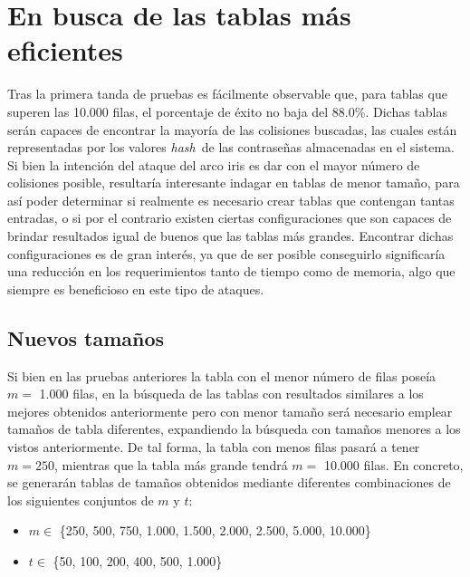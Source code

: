 \documentclass[12pt,spanish,listoffigures,listoftables,listofalgorithms]{tfgetsinf}
\newcommand{\hash}{\textit{hash}}
\begin{document}
\section{En busca de las tablas más eficientes} \label{config perf}

Tras la primera tanda de pruebas es fácilmente observable que, para tablas que superen las 10.000 filas, el porcentaje de éxito no baja del 88.0\%. Dichas tablas serán capaces de encontrar la mayoría de las colisiones buscadas, las cuales están representadas por los valores \hash~de las contraseñas almacenadas en el sistema. Si bien la intención del ataque del arco iris es dar con el mayor número de colisiones posible, resultaría interesante indagar en tablas de menor tamaño, para así poder determinar si realmente es necesario crear tablas que contengan tantas entradas, o si por el contrario existen ciertas configuraciones que son capaces de brindar resultados igual de buenos que las tablas más grandes. Encontrar dichas configuraciones es de gran interés, ya que de ser posible conseguirlo significaría una reducción en los requerimientos tanto de tiempo como de memoria, algo que siempre es beneficioso en este tipo de ataques.

\subsection{Nuevos tamaños} \label{nuevos_tamaños}

Si bien en las pruebas anteriores la tabla con el menor número de filas poseía $m =$ 1.000 filas, en la búsqueda de las tablas con resultados similares a los mejores obtenidos anteriormente pero con menor tamaño será necesario emplear tamaños de tabla diferentes, expandiendo la búsqueda con tamaños menores a los vistos anteriormente. De tal forma, la tabla con menos filas pasará a tener $m = 250$, mientras que la tabla más grande tendrá $m =$ 10.000 filas. En concreto, se generarán tablas de tamaños obtenidos mediante diferentes combinaciones de los siguientes conjuntos de $m$ y $t$:
\\
\begin{itemize}

    \item $m \in$ \{250, 500, 750, 1.000, 1.500, 2.000, 2.500, 5.000, 10.000\}
    
    \item $t \in$ \{50, 100, 200, 400, 500, 1.000\}
    
\end{itemize}
\end{document}
